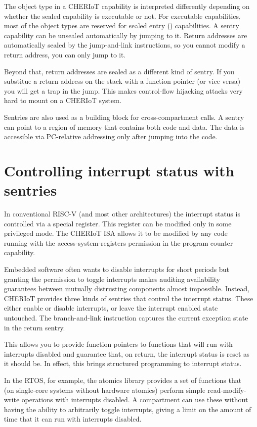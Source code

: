 The object type in a CHERIoT capability is interpreted differently depending on whether the sealed capability is executable or not.
For executable capabilities, most of the object types are reserved for sealed entry () capabilities.
A sentry capability can be unsealed automatically by jumping to it.
Return addresses are automatically sealed by the jump-and-link instructions, so you cannot modify a return address, you can only jump to it.

Beyond that, return addresses are sealed as a different kind of sentry.
If you substitue a return address on the stack with a function pointer (or vice versa) you will get a trap in the jump.
This makes control-flow hijacking attacks very hard to mount on a CHERIoT system.

Sentries are also used as a building block for cross-compartment calls.
A sentry can point to a region of memory that contains both code and data.
The data is accessible via PC-relative addressing only after jumping into the code.

\section[label=interrupt_sentries]{Controlling interrupt status with sentries}

In conventional RISC-V (and most other architectures) the interrupt status is controlled via a special register.
This register can be modified only in some privileged mode.
The CHERIoT ISA allows it to be modified by any code running with the access-system-registers permission in the program counter capability.

Embedded software often wants to disable interrupts for short periods but granting the permission to toggle interrupts makes auditing availability guarantees between mutually distrusting components almost impossible.
Instead, CHERIoT provides three kinds of sentries that control the interrupt status.
These either enable or disable interrupts, or leave the interrupt enabled state untouched.
The branch-and-link instruction captures the current exception state in the return sentry.

This allows you to provide function pointers to functions that will run with interrupts disabled and guarantee that, on return, the interrupt status is reset as it should be.
In effect, this brings structured programming to interrupt status.

In the RTOS, for example, the atomics library provides a set of functions that (on single-core systems without hardware atomics) perform simple read-modify-write operations with interrupts disabled.
A compartment can use these without having the ability to arbitrarily toggle interrupts, giving a limit on the amount of time that it can run with interrupts disabled.


